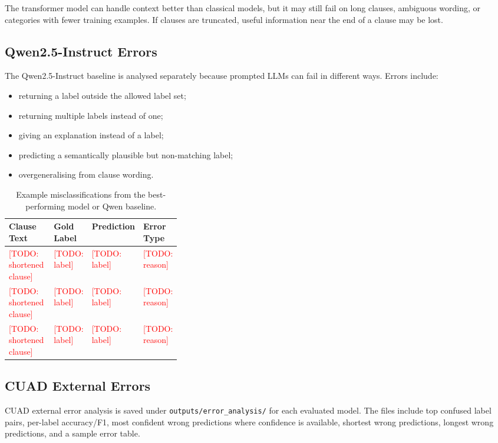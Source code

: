 \documentclass[11pt]{article}
\newcommand{\todo}[1]{\textcolor{red}{[TODO: #1]}}
\begin{document}
The transformer model can handle context better than classical models, but it may still fail on long clauses, ambiguous wording, or categories with fewer training examples. If clauses are truncated, useful information near the end of a clause may be lost.

\subsection{Qwen2.5-Instruct Errors}

The Qwen2.5-Instruct baseline is analysed separately because prompted LLMs can fail in different ways. Errors include:

\begin{itemize}[leftmargin=*]
    \item returning a label outside the allowed label set;
    \item returning multiple labels instead of one;
    \item giving an explanation instead of a label;
    \item predicting a semantically plausible but non-matching label;
    \item overgeneralising from clause wording.
\end{itemize}

\begin{table}[t]
\centering
\small
\begin{tabular}{p{0.34\linewidth}lll}
\toprule
\textbf{Clause Text} & \textbf{Gold Label} & \textbf{Prediction} & \textbf{Error Type} \\
\midrule
\todo{shortened clause} & \todo{label} & \todo{label} & \todo{reason} \\
\todo{shortened clause} & \todo{label} & \todo{label} & \todo{reason} \\
\todo{shortened clause} & \todo{label} & \todo{label} & \todo{reason} \\
\bottomrule
\end{tabular}
\caption{Example misclassifications from the best-performing model or Qwen baseline.}
\label{tab:misclassifications}
\end{table}

\subsection{CUAD External Errors}

CUAD external error analysis is saved under \texttt{outputs/error\_analysis/} for each evaluated model. The files include top confused label pairs, per-label accuracy/F1, most confident wrong predictions where confidence is available, shortest wrong predictions, longest wrong predictions, and a sample error table.
\end{document}
